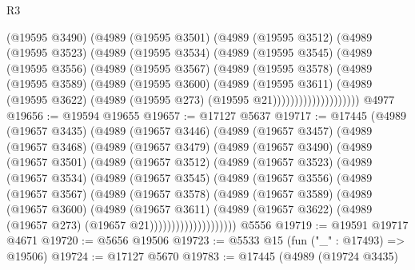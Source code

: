 \begin{lexlean}{R3}
\begin{coremodule}
                (@19595 @3490)
                (@4989
                  (@19595 @3501)
                  (@4989
                    (@19595 @3512)
                    (@4989
                      (@19595 @3523)
                      (@4989
                        (@19595 @3534)
                        (@4989
                          (@19595 @3545)
                          (@4989
                            (@19595 @3556)
                            (@4989
                              (@19595 @3567)
                              (@4989
                                (@19595 @3578)
                                (@4989
                                  (@19595 @3589)
                                  (@4989
                                    (@19595 @3600)
                                    (@4989
                                      (@19595 @3611)
                                      (@4989
                                        (@19595 @3622)
                                        (@4989 (@19595 @273) (@19595 @21))))))))))))))))))))
    @4977
@19656 := @19594 @19655
@19657 := @17127 @5637
@19717 := @17445
    (@4989
      (@19657 @3435)
      (@4989
        (@19657 @3446)
        (@4989
          (@19657 @3457)
          (@4989
            (@19657 @3468)
            (@4989
              (@19657 @3479)
              (@4989
                (@19657 @3490)
                (@4989
                  (@19657 @3501)
                  (@4989
                    (@19657 @3512)
                    (@4989
                      (@19657 @3523)
                      (@4989
                        (@19657 @3534)
                        (@4989
                          (@19657 @3545)
                          (@4989
                            (@19657 @3556)
                            (@4989
                              (@19657 @3567)
                              (@4989
                                (@19657 @3578)
                                (@4989
                                  (@19657 @3589)
                                  (@4989
                                    (@19657 @3600)
                                    (@4989
                                      (@19657 @3611)
                                      (@4989
                                        (@19657 @3622)
                                        (@4989 (@19657 @273) (@19657 @21))))))))))))))))))))
    @5556
@19719 := @19591 @19717 @4671
@19720 := @5656 @19506
@19723 := @5533 @15 (fun ("_" : @17493) => @19506)
@19724 := @17127 @5670
@19783 := @17445
    (@4989
      (@19724 @3435)

\end{coremodule}
\end{lexlean}
